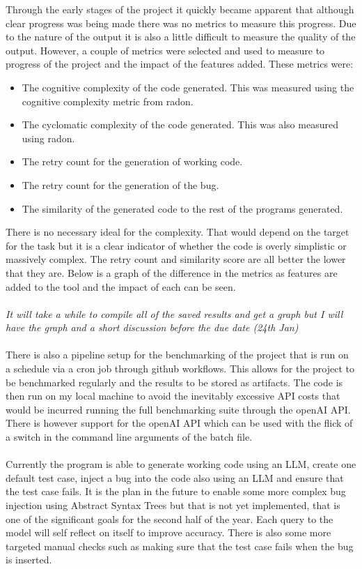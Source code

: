 \documentclass[12pt]{extarticle}
\begin{document}
Through the early stages of the project it quickly became apparent that although clear progress was being made there was no metrics to measure this progress. Due to the nature of the output it is also a little difficult to measure the quality of the output. However, a couple of metrics were selected and used to measure to progress of the project and the impact of the features added. These metrics were:
\begin{itemize}
    \item The cognitive complexity of the code generated. This was measured using the cognitive complexity metric from radon.
    \item The cyclomatic complexity of the code generated. This was also measured using radon.
    \item The retry count for the generation of working code.
    \item The retry count for the generation of the bug.
    \item The similarity of the generated code to the rest of the programs generated.
\end{itemize}
There is no necessary ideal for the complexity. That would depend on the target for the task but it is a clear indicator of whether the code is overly simplistic or massively complex. The retry count and similarity score are all better the lower that they are. Below is a graph of the difference in the metrics as features are added to the tool and the impact of each can be seen.\\
\\
\textit{It will take a while to compile all of the saved results and get a graph but I will have the graph and a short discussion before the due date (24th Jan)}\\
\\
There is also a pipeline setup for the benchmarking of the project that is run on a schedule via a cron job through github workflows. This allows for the project to be benchmarked regularly and the results to be stored as artifacts. The code is then run on my local machine to avoid the inevitably excessive API costs that would be incurred running the full benchmarking suite through the openAI API. There is however support for the openAI API which can be used with the flick of a switch in the command line arguments of the batch file.\\
\\
Currently the program is able to generate working code using an LLM, create one default test case, inject a bug into the code also using an LLM and ensure that the test case fails. It is the plan in the future to enable some more complex bug injection using Abstract Syntax Trees but that is not yet implemented, that is one of the significant goals for the second half of the year. Each query to the model will self reflect on itself to improve accuracy. There is also some more targeted manual checks such as making sure that the test case fails when the bug is inserted.
\end{document}
